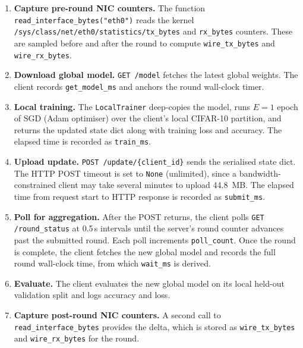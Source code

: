 \documentclass[12pt,a4paper]{report}
\begin{document}
\begin{enumerate}
  \item \textbf{Capture pre-round NIC counters.}  The function
        \texttt{read\_interface\_bytes("eth0")} reads the kernel
        \texttt{/sys/class/net/eth0/statistics/tx\_bytes} and
        \texttt{rx\_bytes} counters.  These are sampled before and after
        the round to compute \texttt{wire\_tx\_bytes} and
        \texttt{wire\_rx\_bytes}.

  \item \textbf{Download global model.}  \texttt{GET /model} fetches the
        latest global weights.  The client records
        \texttt{get\_model\_ms} and anchors the round wall-clock timer.

  \item \textbf{Local training.}  The \texttt{LocalTrainer} deep-copies
        the model, runs $E = 1$ epoch of SGD (Adam optimiser) over the
        client's local CIFAR-10 partition, and returns the updated state
        dict along with training loss and accuracy.  The elapsed time is
        recorded as \texttt{train\_ms}.

  \item \textbf{Upload update.}  \texttt{POST /update/\{client\_id\}}
        sends the serialised state dict.  The HTTP POST timeout is set
        to \texttt{None} (unlimited), since a bandwidth-constrained
        client may take several minutes to upload 44.8~MB.  The elapsed
        time from request start to HTTP response is recorded as
        \texttt{submit\_ms}.

  \item \textbf{Poll for aggregation.}  After the POST returns, the
        client polls \texttt{GET /round\_status} at 0.5\,s intervals
        until the server's round counter advances past the submitted
        round.  Each poll increments \texttt{poll\_count}.  Once the
        round is complete, the client fetches the new global model and
        records the full round wall-clock time, from which
        \texttt{wait\_ms} is derived.

  \item \textbf{Evaluate.}  The client evaluates the new global model on
        its local held-out validation split and logs accuracy and loss.

  \item \textbf{Capture post-round NIC counters.}  A second call to
        \texttt{read\_interface\_bytes} provides the delta, which is
        stored as \texttt{wire\_tx\_bytes} and \texttt{wire\_rx\_bytes}
        for the round.
\end{enumerate}
\end{document}
